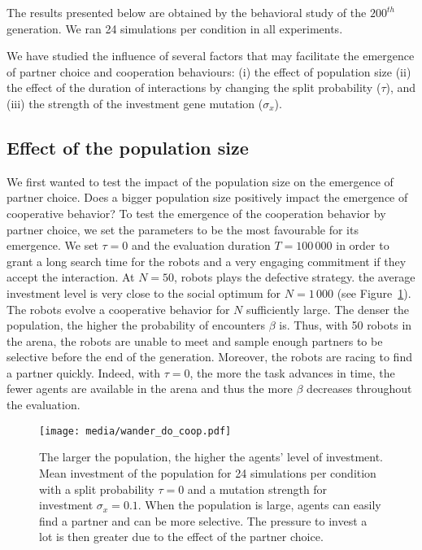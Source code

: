 \documentclass[letterpaper]{article}
\begin{document}
The results presented below are obtained by the behavioral study of the $200^{th}$ generation.  We ran 24 simulations per condition in all experiments.

We have studied the influence of several factors that may facilitate the emergence of partner choice and cooperation behaviours: (i) the effect of population size (ii) the effect of the duration of interactions by changing the split probability ($\tau$), and (iii) the strength of the investment gene mutation ($\sigma_x$). 

\subsection{Effect of the population size}

We first wanted to test the impact of the population size on the emergence of partner choice. Does a bigger population size positively impact the emergence of cooperative behavior? %
To test the emergence of the cooperation behavior by partner choice, we set the parameters to be the most favourable for its emergence. We set $\tau = 0$ and the evaluation duration $T = 100\,000$ in order to grant a long search time for the robots and a very engaging commitment if they accept the interaction. %
At $N = 50$, robots plays the defective strategy. the average investment level is very close to the social optimum for $N = 1\,000$ (see Figure~\ref{fig:do_coop}). %
The robots evolve a cooperative behavior for $N$ sufficiently large. The denser the population, the higher the probability of encounters $\beta$ is. Thus, with 50 robots in the arena, the robots are unable to meet and sample enough partners to be selective before the end of the generation. Moreover, the robots are racing to find a partner quickly. Indeed, with $\tau = 0$, the more the task advances in time, the fewer agents are available in the arena and thus the more $\beta$ decreases throughout the evaluation. %



\begin{figure}[tbhp]
    \begin{center}
        \texttt{[image: media/wander\_do\_coop.pdf]}
        \vskip 0.25cm
        \caption{The larger the population, the higher the agents' level of investment.
        Mean investment of the population for 24 simulations per condition with a split probability $\tau = 0$ and a mutation strength for investment $\sigma_x = 0.1$. When the population is large, agents can easily find a partner and can be more selective. The pressure to invest a lot is then greater due to the effect of the partner choice.
        }
        \label{fig:do_coop}
    \end{center}
\end{figure}
\end{document}
